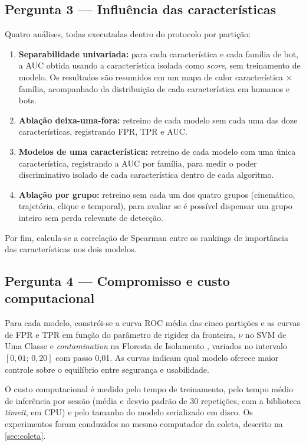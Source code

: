 \subsection{Pergunta 3 --- Influência das características}

Quatro análises, todas executadas dentro do protocolo por partição:
\begin{enumerate}
    \item \textbf{Separabilidade univariada:} para cada característica e cada família de bot, a AUC obtida usando a característica isolada como \textit{score}, sem treinamento de modelo. Os resultados são resumidos em um mapa de calor característica $\times$ família, acompanhado da distribuição de cada característica em humanos e bots.
    \item \textbf{Ablação deixa-uma-fora:} retreino de cada modelo sem cada uma das doze características, registrando FPR, TPR e AUC.
    \item \textbf{Modelos de uma característica:} retreino de cada modelo com uma única característica, registrando a AUC por família, para medir o poder discriminativo isolado de cada característica dentro de cada algoritmo.
    \item \textbf{Ablação por grupo:} retreino sem cada um dos quatro grupos (cinemático, trajetória, clique e temporal), para avaliar se é possível dispensar um grupo inteiro sem perda relevante de detecção.
\end{enumerate}
Por fim, calcula-se a correlação de Spearman entre os rankings de importância das características nos dois modelos.

\subsection{Pergunta 4 --- Compromisso e custo computacional}

Para cada modelo, constrói-se a curva ROC média das cinco partições e as curvas de FPR e TPR em função do parâmetro de rigidez da fronteira, $\nu$ no SVM de Uma Classe e \textit{contamination} na Floresta de Isolamento \cite{scholkopf2001b, liu2008}, variados no intervalo $[0{,}01;\,0{,}20]$ com passo 0,01. As curvas indicam qual modelo oferece maior controle sobre o equilíbrio entre segurança e usabilidade.

O custo computacional é medido pelo tempo de treinamento, pelo tempo médio de inferência por sessão (média e desvio padrão de 30 repetições, com a biblioteca \textit{timeit}, em CPU) e pelo tamanho do modelo serializado em disco. Os experimentos foram conduzidos no mesmo computador da coleta, descrito na \autoref{sec:coleta}.

